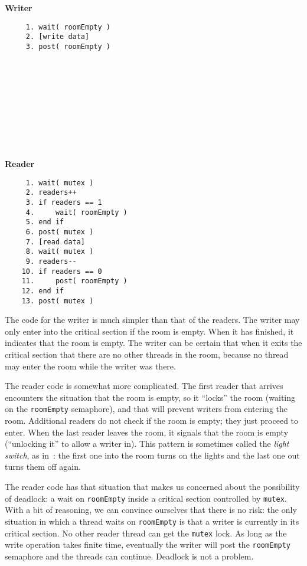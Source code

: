 \begin{multicols}{2}
	\textbf{Writer}\vspace{-2em}
	\begin{verbatim}
	 1. wait( roomEmpty )
	 2. [write data]
	 3. post( roomEmpty )
	 
	 
	 
	 
	 
	 
	 
	 
	 
	 
  \end{verbatim}
	\columnbreak
	\textbf{Reader}\vspace{-2em}
	\begin{verbatim}
	 1. wait( mutex )
	 2. readers++
	 3. if readers == 1
	 4.     wait( roomEmpty )
	 5. end if
	 6. post( mutex )
	 7. [read data]
	 8. wait( mutex )
	 9. readers--
	10. if readers == 0
	11.     post( roomEmpty )
	12. end if
	13. post( mutex )
  \end{verbatim}
\end{multicols}
\vspace{-2em}

The code for the writer is much simpler than that of the readers. The writer may only enter into the critical section if the room is empty. When it has finished, it indicates that the room is empty. The writer can be certain that when it exits the critical section that there are no other threads in the room, because no thread may enter the room while the writer was there.

The reader code is somewhat more complicated. The first reader that arrives encounters the situation that the room is empty, so it ``locks'' the room (waiting on the \texttt{roomEmpty} semaphore), and that will prevent writers from entering the room. Additional readers do not check if the room is empty; they just proceed to enter. When the last reader leaves the room, it signals that the room is empty (``unlocking it'' to allow a writer in). This pattern is sometimes called the \textit{light switch}, as in~\cite{mte241}: the first one into the room turns on the lights and the last one out turns them off again.

The reader code has that situation that makes us concerned about the possibility of deadlock: a wait on \texttt{roomEmpty} inside a critical section controlled by \texttt{mutex}. With a bit of reasoning, we can convince ourselves that there is no risk: the only situation in which a thread waits on \texttt{roomEmpty} is that a writer is currently in its critical section. No other reader thread can get the \texttt{mutex} lock. As long as the write operation takes finite time, eventually the writer will post the \texttt{roomEmpty} semaphore and the threads can continue. Deadlock is not a problem.

